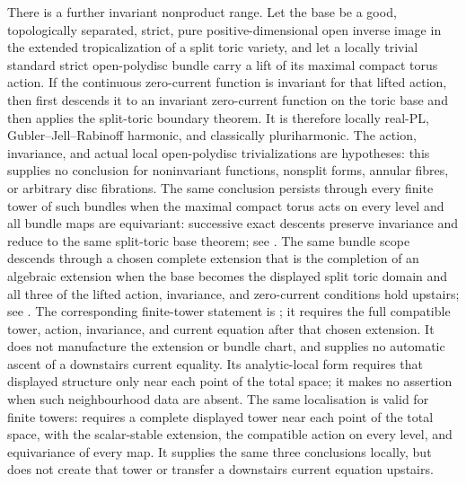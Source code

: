 There is a further invariant nonproduct range.  Let the base be a good,
topologically separated, strict, pure positive-dimensional open inverse
image in the extended tropicalization of a split toric variety, and let a
locally trivial standard strict open-polydisc bundle carry a lift of its
maximal compact torus action.  If the continuous zero-current function is
invariant for that lifted action, then
 first descends it to
an invariant zero-current function on the toric base and then applies the
split-toric boundary theorem.  It is therefore locally real-PL,
Gubler--Jell--Rabinoff harmonic, and classically pluriharmonic.  The action,
invariance, and actual local open-polydisc trivializations are hypotheses:
this supplies no conclusion for noninvariant functions, nonsplit forms,
annular fibres, or arbitrary disc fibrations.
The same conclusion persists through every finite tower of such bundles
when the maximal compact torus acts on every level and all bundle maps are
equivariant: successive exact descents preserve invariance and reduce to
the same split-toric base theorem; see
.
The same bundle scope descends through a chosen complete extension that is
the completion of an algebraic extension when the base becomes the displayed
split toric domain and all three of the lifted action, invariance, and
zero-current conditions hold upstairs; see
.
The corresponding finite-tower statement is
;
it requires the full compatible tower, action, invariance, and current
equation after that chosen extension.
It does not manufacture the extension or bundle chart, and supplies no
automatic ascent of a downstairs current equality.
Its analytic-local form
requires that displayed structure only near each point of the total space;
it makes no assertion when such neighbourhood data are absent.
The same localisation is valid for finite towers:
requires a complete displayed tower near each point of the total space, with
the scalar-stable extension, the compatible action on every level, and
equivariance of every map.  It supplies the same three conclusions locally,
but does not create that tower or transfer a downstairs current equation
upstairs.

